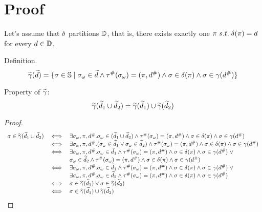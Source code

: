 \section{Proof}\label{sec:proof}


Let's assume that $\delta$ partitions $\mathbb{D}$, that is,
there exists exactly one $\pi\ s.t. \; \delta(\pi)=d$
for every $d \in \mathbb{D}$.

\bigskip

Definition.
\[
  \widetilde{\gamma}(\widetilde{d}) = \{
    \sigma \in \mathbb{S} \mid
    {\sigma}_\omega \in \widetilde{d} \wedge
    {\tau}^{\#}({\sigma}_\omega) = (\pi, {d}^{\#}) \wedge
    \sigma \in \delta(\pi) \wedge
    \sigma \in \gamma({d}^{\#})
  \}
\]

Property of $\widetilde{\gamma}$:
\[
  \widetilde{\gamma}(\widetilde{d}_1 \cup \widetilde{d}_2) = \widetilde{\gamma}(\widetilde{d}_1) \cup \widetilde{\gamma}(\widetilde{d}_2)
\]

\begin{proof}

\[
  \begin{array}{rcl}
    \sigma \in \widetilde{\gamma}(\widetilde{d}_1 \cup \widetilde{d}_2)
    &\iff& \exists {\sigma}_\omega,\pi,{d}^{\#}. {\sigma}_\omega \in (\widetilde{d}_1 \cup \widetilde{d}_2) \wedge
      {\tau}^{\#}({\sigma}_\omega) = (\pi, {d}^{\#}) \wedge
      \sigma \in \delta(\pi) \wedge
      \sigma \in \gamma({d}^{\#}) \\
    &\iff& \exists {\sigma}_\omega,\pi,{d}^{\#}. ({\sigma}_\omega \in \widetilde{d}_1 \lor {\sigma}_\omega \in \widetilde{d}_2) \wedge
      {\tau}^{\#}({\sigma}_\omega) = (\pi, {d}^{\#}) \wedge
      \sigma \in \delta(\pi) \wedge
      \sigma \in \gamma({d}^{\#}) \\
    &\iff& \exists {\sigma}_\omega,\pi,{d}^{\#}. {\sigma}_\omega \in \widetilde{d}_1 \wedge
      {\tau}^{\#}({\sigma}_\omega) = (\pi, {d}^{\#}) \wedge
      \sigma \in \delta(\pi) \wedge
      \sigma \in \gamma({d}^{\#}) \; \lor\\
    && {\sigma}_\omega \in \widetilde{d}_2 \wedge
      {\tau}^{\#}({\sigma}_\omega) = (\pi, {d}^{\#}) \wedge
      \sigma \in \delta(\pi) \wedge
      \sigma \in \gamma({d}^{\#}) \\
    &\iff& \exists {\sigma}_\omega,\pi,{d}^{\#}. {\sigma}_\omega \in \widetilde{d}_1 \wedge
      {\tau}^{\#}({\sigma}_\omega) = (\pi, {d}^{\#}) \wedge
      \sigma \in \delta(\pi) \wedge
      \sigma \in \gamma({d}^{\#}) \; \lor \\
    && \exists {\sigma}_\omega,\pi,{d}^{\#}. {\sigma}_\omega \in \widetilde{d}_2 \wedge
      {\tau}^{\#}({\sigma}_\omega) = (\pi, {d}^{\#}) \wedge
      \sigma \in \delta(\pi) \wedge
      \sigma \in \gamma({d}^{\#}) \\
    &\iff& \sigma \in \widetilde{\gamma}(\widetilde{d}_1) \lor \sigma \in \widetilde{\gamma}(\widetilde{d}_2) \\
    &\iff& \sigma \in \widetilde{\gamma}(\widetilde{d}_1) \cup \widetilde{\gamma}(\widetilde{d}_2)
  \end{array}
\]
\end{proof}

